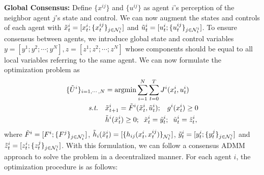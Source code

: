 \documentclass[twoside,11pt]{article}
\begin{document}
\textbf{Global Consensus:} Define $\{x^{ij}\}$ and $\{u^{ij}\}$ as agent $i$'s perception of the neighbor agent $j$'s state and control. We can now augment the states and controls of each agent with $\tilde{x}^i_t=[x^i_t;\{x^{ij}_t\}_{j\in{\cal N}^i_t}]$ and $\tilde{u}^i_t=[u^i_t;\{u^{ij}_t\}_{j\in{\cal N}^i_t}]$. To ensure consensus between agents, we introduce global state and control variables $y=[y^1; y^2; \cdots; y^N], z=[z^1;z^2;\cdots;z^N]$ whose components should be equal to all local variables referring to the same agent. We can now formulate the optimization problem as
\begin{equation}
\begin{split}
 \{\tilde{U}^i\}_{i=1,\cdots,N}&=\argmin \sum_{i=1}^N \sum_{t=0}^T J^i(x^i_t,u^i_t)\\
\textit{s.t.} \quad & \tilde{x}^i_{t+1}=\tilde{F}^i(\tilde{x}^i_t,\tilde{u}^i_t); \hspace{3mm} g^i(x^i_t)\geq 0 \\
& \tilde{h}^i(\tilde{x}^i_t) \geq 0; \hspace{2mm} \tilde{x}^i_t = \tilde{y}^i_t; \hspace{2mm} \tilde{u}^i_t = \tilde{z}^i_t,
\end{split}
\end{equation}
where $\tilde{F}^i=[F^i;\{F^j\}_{j\in{\cal N}^i_t}]$, $\tilde{h}_i(\tilde{x}^i_t) = [\{h_{ij}(x^i_t, x^{ij}_t)\}_{{\cal N}^i_t}]$, $\tilde{y}^i_t=[y^i_t;\{y^j_t\}_{j\in{\cal N}^i_t}]$ and   $\tilde{z}^i_t=[z^i_t;\{z^j_t\}_{j\in{\cal N}^i_t}]$. With this formulation, we can follow a consensus \ac{ADMM} approach to solve the problem in a decentralized manner. For each agent $i$, the optimization procedure is as follows:
\end{document}
